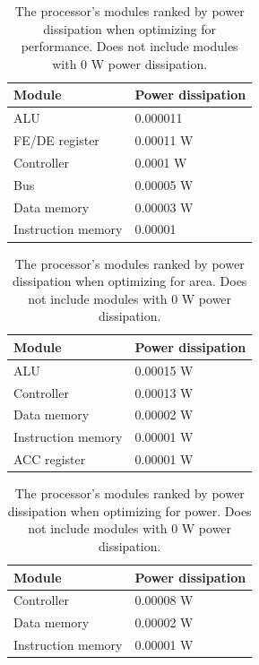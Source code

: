 \documentclass[a4paper,11pt]{article}
\begin{document}
\begin{appendix}
\begin{table}[h!]
\centering
\begin{tabular}{|l|l|} \hline
  \textbf{Module} & \textbf{Power dissipation}\\ \hline
  ALU & 0.000011 \\
  FE/DE register & 0.00011 W \\
  Controller & 0.0001 W \\
  Bus & 0.00005 W \\
  Data memory & 0.00003 W \\
  Instruction memory & 0.00001 \\ \hline
\end{tabular}
\caption{The processor's modules ranked by power dissipation when optimizing for performance. Does not include modules with 0 W power dissipation.}
\label{tab:power_rank_perf}
\end{table}

\begin{table}[h!]
\centering
\begin{tabular}{|l|l|} \hline
  \textbf{Module} & \textbf{Power dissipation}\\ \hline
  ALU & 0.00015 W \\
  Controller & 0.00013 W \\
  Data memory & 0.00002 W \\ 
  Instruction memory & 0.00001 W \\
  ACC register & 0.00001 W \\ \hline
\end{tabular}
\caption{The processor's modules ranked by power dissipation when optimizing for area. Does not include modules with 0 W power dissipation.}
\label{tab:power_rank_area}
\end{table}

\begin{table}[h!]
\centering
\begin{tabular}{|l|l|} \hline
  \textbf{Module} & \textbf{Power dissipation}\\ \hline
  Controller & 0.00008 W \\
  Data memory & 0.00002 W \\ 
  Instruction memory & 0.00001 W \\ \hline
\end{tabular}
\caption{The processor's modules ranked by power dissipation when optimizing for power. Does not include modules with 0 W power dissipation.}
\label{tab:power_rank_pow}
\end{table}

\end{appendix}
\end{document}
